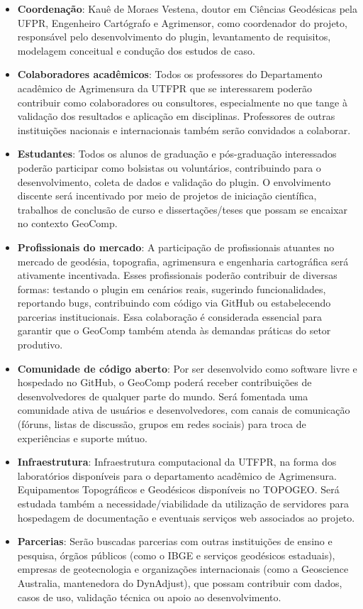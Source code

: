 \documentclass[
        12pt,                           %
        openright,                      %
        oneside,
        a4paper,                        %
        chapter=TITLE,         %
        section=TITLE,         %
        subsection=Title,      %
        english,                        %
        portugues,                      %
        ]{abntex2}
\begin{document}
\begin{itemize}
    \item \textbf{Coordenação}: Kauê de Moraes Vestena, doutor em Ciências Geodésicas pela UFPR, Engenheiro Cartógrafo e Agrimensor, como coordenador do projeto, responsável pelo desenvolvimento do plugin, levantamento de requisitos, modelagem conceitual e condução dos estudos de caso.
    \item \textbf{Colaboradores acadêmicos}: Todos os professores do Departamento acadêmico de Agrimensura da UTFPR que se interessarem poderão contribuir como colaboradores ou consultores, especialmente no que tange à validação dos resultados e aplicação em disciplinas. Professores de outras instituições nacionais e internacionais também serão convidados a colaborar.
    \item \textbf{Estudantes}: Todos os alunos de graduação e pós-graduação interessados poderão participar como bolsistas ou voluntários, contribuindo para o desenvolvimento, coleta de dados e validação do plugin. O envolvimento discente será incentivado por meio de projetos de iniciação científica, trabalhos de conclusão de curso e dissertações/teses que possam se encaixar no contexto GeoComp.
    \item \textbf{Profissionais do mercado}: A participação de profissionais atuantes no mercado de geodésia, topografia, agrimensura e engenharia cartográfica será ativamente incentivada. Esses profissionais poderão contribuir de diversas formas: testando o plugin em cenários reais, sugerindo funcionalidades, reportando bugs, contribuindo com código via GitHub ou estabelecendo parcerias institucionais. Essa colaboração é considerada essencial para garantir que o GeoComp também atenda às demandas práticas do setor produtivo.
    \item \textbf{Comunidade de código aberto}: Por ser desenvolvido como software livre e hospedado no GitHub, o GeoComp poderá receber contribuições de desenvolvedores de qualquer parte do mundo. Será fomentada uma comunidade ativa de usuários e desenvolvedores, com canais de comunicação (fóruns, listas de discussão, grupos em redes sociais) para troca de experiências e suporte mútuo.
    \item \textbf{Infraestrutura}: Infraestrutura computacional da UTFPR, na forma dos laboratórios disponíveis para o departamento acadêmico de Agrimensura. Equipamentos Topográficos e Geodésicos disponíveis no TOPOGEO. Será estudada também a necessidade/viabilidade da utilização de servidores para hospedagem de documentação e eventuais serviços web associados ao projeto.
    \item \textbf{Parcerias}: Serão buscadas parcerias com outras instituições de ensino e pesquisa, órgãos públicos (como o IBGE e serviços geodésicos estaduais), empresas de geotecnologia e organizações internacionais (como a Geoscience Australia, mantenedora do DynAdjust), que possam contribuir com dados, casos de uso, validação técnica ou apoio ao desenvolvimento. 
\end{itemize}
\end{document}
